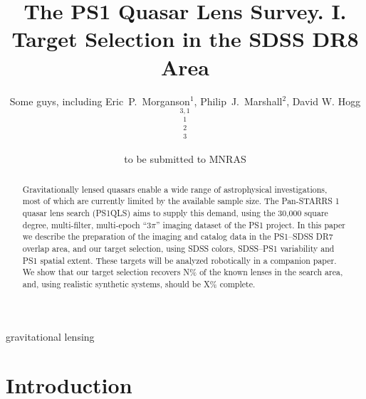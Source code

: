 \documentclass[useAMS,usenatbib]{mn2e}
\title[The PS1QLS Survey. I.]
{The PS1 Quasar Lens Survey. I. Target Selection in the SDSS DR8 Area}
\author[Some guys]{%
  Some guys, including
  Eric~P.~Morganson$^{1}$,
  Philip~J.~Marshall$^{2}$,
  David W. Hogg$^{3,1}$
  \newauthor{%
  and the PS1 Collaboration}
  \medskip\\
  $^1$\mpia\\
  $^2$\oxford\\
  $^3$\nyu
}
\begin{document}
             
\date{to be submitted to MNRAS}
             
\pagerange{\pageref{firstpage}--\pageref{lastpage}}

\maketitle           

\label{firstpage}


\begin{abstract}

Gravitationally lensed quasars enable a wide range of astrophysical
investigations, most of which are currently limited by the available sample
size. The Pan-STARRS 1 quasar lens search (PS1QLS) aims to supply this demand,
using the 30,000 square degree, multi-filter, multi-epoch ``$3\pi$'' imaging
dataset of the PS1 project.  In this paper we describe the preparation of the
imaging and catalog data in the PS1--SDSS DR7 overlap area, and our target
selection, using SDSS colors, SDSS--PS1 variability and PS1 spatial extent.
These targets will  be analyzed robotically in a companion paper.  We show
that our target selection recovers N\% of the known lenses in the search area,
and, using realistic synthetic systems, should be X\% complete. 

\end{abstract}


\begin{keywords}
  gravitational lensing
\end{keywords}

\setcounter{footnote}{1}


\section{Introduction}
\label{sec:intro}






\end{document}
